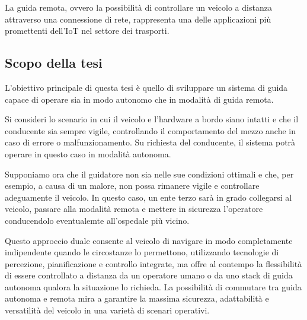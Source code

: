 \noindent La guida remota, ovvero la possibilità di controllare un veicolo a distanza attraverso una connessione di rete, rappresenta una delle applicazioni più promettenti dell'IoT nel settore dei trasporti.

\subsection{Scopo della tesi}
L'obiettivo principale di questa tesi è quello di sviluppare un sistema di guida capace di operare sia in modo autonomo che in modalità di guida remota.

\noindent Si consideri lo scenario in cui il veicolo e l'hardware a bordo siano intatti e che il conducente sia sempre vigile, controllando il comportamento del mezzo anche in caso di errore o malfunzionamento. Su richiesta del conducente, il sistema potrà operare in questo caso in modalità autonoma.

\noindent Supponiamo ora che il guidatore non sia nelle sue condizioni ottimali e che, per esempio, a causa di un malore, non possa rimanere vigile e controllare adeguamente il veicolo. In questo caso, un ente terzo sarà in grado collegarsi al veicolo, passare alla modalità remota e mettere in sicurezza l'operatore conducendolo eventualemte all'ospedale più vicino.

\noindent Questo approccio duale consente al veicolo di navigare in modo completamente indipendente quando le circostanze lo permettono, utilizzando tecnologie di percezione, pianificazione e controllo integrate, ma offre al contempo la flessibilità di essere controllato a distanza da un operatore umano o da uno stack di guida autonoma qualora la situazione lo richieda. La possibilità di commutare tra guida autonoma e remota mira a garantire la massima sicurezza, adattabilità e versatilità del veicolo in una varietà di scenari operativi.

